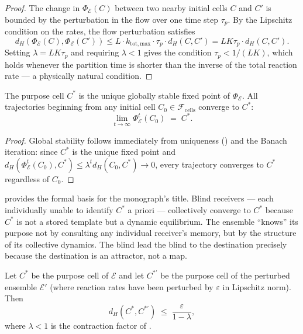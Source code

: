 \begin{proof}
The change in $\Phi_\mathcal{E}(C)$ between two nearby initial cells $C$ and
$C'$ is bounded by the perturbation in the flow over one time step $\tau_p$.
By the Lipschitz condition on the rates, the flow perturbation satisfies
\[
  d_H(\Phi_\mathcal{E}(C), \Phi_\mathcal{E}(C'))
  \leq L \cdot k_{\mathrm{tot,max}} \cdot \tau_p \cdot d_H(C, C')
  = LK\tau_p \cdot d_H(C, C') .
\]
Setting $\lambda = LK\tau_p$ and requiring $\lambda < 1$ gives the condition
$\tau_p < 1/(LK)$, which holds whenever the partition time is shorter than
the inverse of the total reaction rate — a physically natural condition.
\end{proof}

\begin{theorem}
\label{thm:purpose-attractor}
The purpose cell $C^*$ is the unique globally stable fixed point of
$\Phi_\mathcal{E}$.  All trajectories beginning from any initial cell
$C_0 \in \mathcal{F}_{\mathrm{cells}}$ converge to $C^*$:
\[
  \lim_{t \to \infty} \Phi_\mathcal{E}^t(C_0) \;=\; C^* .
\]
\end{theorem}

\begin{proof}
Global stability follows immediately from uniqueness ()
and the Banach iteration: since $C^*$ is the unique fixed point and
$d_H(\Phi_\mathcal{E}^t(C_0), C^*) \leq \lambda^t d_H(C_0, C^*) \to 0$,
every trajectory converges to $C^*$ regardless of $C_0$.
\end{proof}

\begin{remark}
\label{rem:purpose-no-template}
 provides the formal basis for the monograph's
title.  Blind receivers — each individually unable to identify $C^*$ a priori
— collectively converge to $C^*$ because $C^*$ is not a stored template but
a dynamic equilibrium.  The ensemble ``knows'' its purpose not by consulting
any individual receiver's memory, but by the structure of its collective
dynamics.  The blind lead the blind to the destination precisely because the
destination is an attractor, not a map.
\end{remark}

\begin{theorem}
\label{thm:purpose-stability}
Let $C^*$ be the purpose cell of $\mathcal{E}$ and let $C^{*'}$ be the purpose
cell of the perturbed ensemble $\mathcal{E}'$ (where reaction rates have been
perturbed by $\varepsilon$ in Lipschitz norm).  Then
\[
  d_H(C^*, C^{*'}) \;\leq\; \frac{\varepsilon}{1 - \lambda} ,
\]
where $\lambda < 1$ is the contraction factor of .
\end{theorem}

